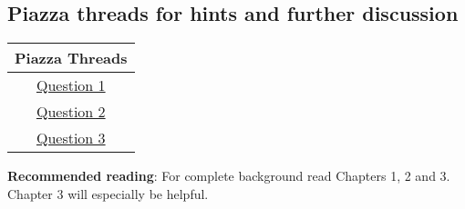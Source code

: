 \documentclass[12pt]{article}
\begin{document}
\hrulefill
\pagebreak

\subsection*{Piazza threads for hints and further discussion}
\begin{center}
    \begin{tabular}{|c|}
    \hline
    Piazza Threads \\ [0.5ex] 
    \hline \hline 
    \href{https://piazza.com/class/ka2roz7rb9m3j4?cid=10}{Question 1}\\
    \href{https://piazza.com/class/ka2roz7rb9m3j4?cid=11}{Question 2}\\
    \href{https://piazza.com/class/ka2roz7rb9m3j4?cid=12}{Question 3}\\
    
    \hline
    \end{tabular}
\end{center}

\textbf{Recommended reading}: For complete background read Chapters 1, 2 and 3. Chapter 3 will especially be helpful.
\end{document}
